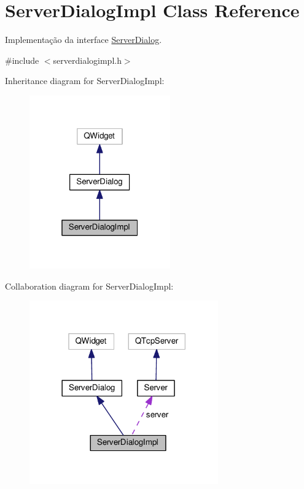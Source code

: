 \hypertarget{classServerDialogImpl}{}\section{Server\+Dialog\+Impl Class Reference}
\label{classServerDialogImpl}


Implementação da interface \hyperlink{classServerDialog}{Server\+Dialog}.  




{\ttfamily \#include $<$serverdialogimpl.\+h$>$}



Inheritance diagram for Server\+Dialog\+Impl\+:\nopagebreak
\begin{figure}[H]
\begin{center}
\leavevmode
\includegraphics[width=172pt]{d1/da5/classServerDialogImpl__inherit__graph}
\end{center}
\end{figure}


Collaboration diagram for Server\+Dialog\+Impl\+:\nopagebreak
\begin{figure}[H]
\begin{center}
\leavevmode
\includegraphics[width=230pt]{d3/d6b/classServerDialogImpl__coll__graph}
\end{center}
\end{figure}
